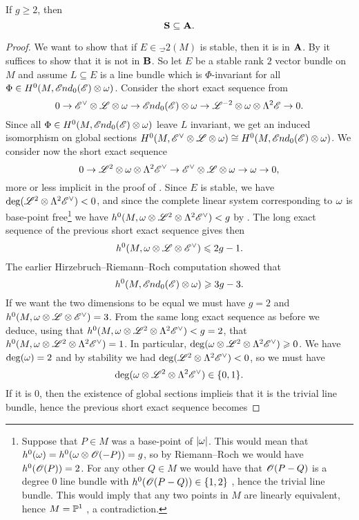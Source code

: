 \documentclass[A4paper, 12pt, british, reqno]{amsart}
\newcommand{\ot}{\otimes}
\newcommand{\dual}{^{\vee}}
\begin{document}
\begin{lm}\label{lm:stable}
    If $g\geqslant 2$, then
    \[ \bfS\subseteq \bfA. \]
    \begin{proof}
	We want to show that if $E\in \Vec_{2}(M)$ is stable, then it is in $\bfA$.
	By  it suffices to show that it is not in $\bfB$.
	So let $E$ be a stable rank $2$ vector bundle on $M$ and assume $L\subseteq E$ is a line bundle which is $\Phi$-invariant for all $\Phi\in H^{0}(M,\sEnd_{0}(\E)\ot \w)$.
	Consider the short exact sequence from 
	\[ 0\to \E\dual\ot \L\ot\w\to \sEnd_{0}(\E)\ot \w \to \L^{-2}\ot \w\ot \Lambda^{2}\E\to 0. \]
	Since all $\Phi\in H^{0}(M,\sEnd_{0}(\E)\ot\w)$ leave $L$ invariant, we get an induced isomorphism on global sections $H^{0}(M,\E\dual\ot\L\ot\w)\cong H^{0}(M,\sEnd_{0}(\E)\ot \w)$.
	We consider now the short exact sequence
	\[ 0\to \L^{2}\ot \w\ot \Lambda^{2}\E\dual \to \E\dual \ot \L\ot \w\to \w\to 0, \]
	more or less implicit in the proof of .
	Since $E$ is stable, we have $\deg(\L^{2}\ot \Lambda^{2}\E\dual)<0$, and since the complete linear system corresponding to $\w$ is base-point free\footnote{Suppose that $P\in M$ was a base-point of $|\w|$.
	This would mean that $h^{0}(\w)=h^{0}(\w\ot \O(-P))=g$, so by Riemann--Roch we would have $h^{0}(\O(P))=2$.
	For any other $Q\in M$ we would have that $\O(P-Q)$ is a degree $0$ line bundle with $h^{0}(\O(P-Q))\in \{1,2\}$ \cite[Proof of Proposition IV.3.1]{har77}, hence the trivial line bundle.
	This would imply that any two points in $M$ are linearly equivalent, hence $M=\P^{1}$ \cite[Example II.6.10.1]{har77}, a contradiction.} 
	    we have $h^{0}(M,\w\ot \L^{2}\ot\Lambda^{2}\E\dual)<g$ by \cite[Proposition IV.3.1]{har77}.
	The long exact sequence of the previous short exact sequence gives then
	\[ h^{0}(M,\w\ot \L\ot \E\dual)\leqslant 2g-1. \]
	The earlier Hirzebruch--Riemann--Roch computation showed that
	\[ h^{0}(M,\sEnd_{0}(\E)\ot \w)\geqslant 3g-3. \]
	If we want the two dimensions to be equal we must have $g=2$ and $h^{0}(M,\w\ot\L\ot\E\dual)=3$.
	From the same long exact sequence as before we deduce, using that $h^{0}(M,\w\ot\L^{2}\ot \Lambda^{2}\E\dual)<g=2$, that $h^{0}(M,\w\ot\L^{2}\ot\Lambda^{2}\E\dual)=1$.
	In particular, $\deg(\w\ot\L^{2}\ot\Lambda^{2}\E\dual)\geqslant 0$.
	We have $\deg(\w)=2$ and by stability we had $\deg(\L^{2}\ot \Lambda^{2}\E\dual)<0$, so we must have
	\[ \deg(\w\ot\L^{2}\ot \Lambda^{2}\E\dual)\in \{0,1\}. \]
	If it is $0$, then the existence of global sections implieis that it is the trivial line bundle, hence the previous short exact sequence becomes

\end{proof}
\end{lm}
\end{document}
